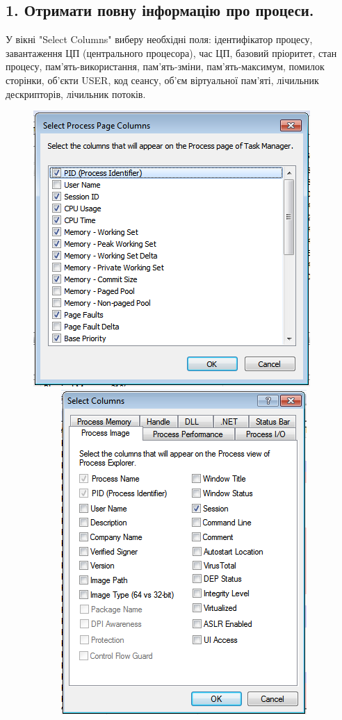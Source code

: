 \documentclass{article}
\begin{document}
\begin{normalsize}
	\subsection*{1. Отримати повну інформацію про процеси.}
	У вікні "Select Columns" виберу необхідні поля: ідентифікатор процесу, завантаження ЦП (центрального процесора), час ЦП, базовий пріоритет, стан процесу, пам'ять-використання, пам'ять-зміни, пам'ять-максимум, помилок сторінки, об’єкти USER, код сеансу, об’єм віртуальної пам’яті, лічильник дескрипторів, лічильник потоків.
	\begin{figure}[h]
		\centering
		\includegraphics[scale=0.42]{1}~~~~~
		\includegraphics[scale=0.42]{2}
	\end{figure}


\end{normalsize}
\end{document}
